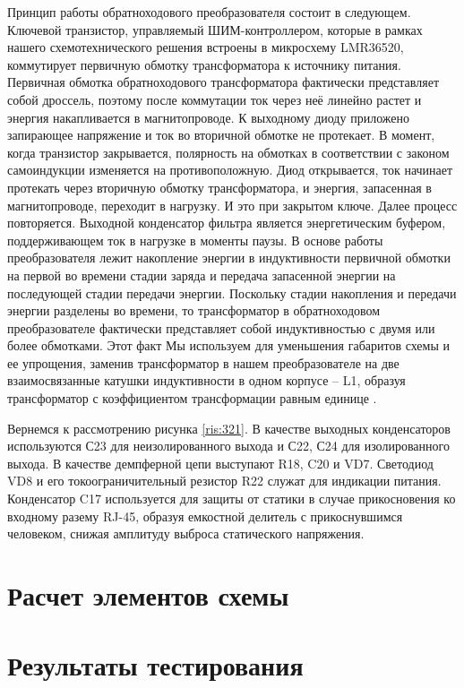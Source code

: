 Принцип работы обратноходового преобразователя состоит в следующем. Ключевой транзистор, 
управляемый ШИМ-контроллером, которые в рамках нашего схемотехнического решения встроены
в микросхему LMR36520, коммутирует первичную обмотку трансформатора к источнику питания.
Первичная обмотка обратноходового трансформатора фактически представляет собой дроссель, 
поэтому после коммутации ток через неё линейно растет и энергия накапливается в магнитопроводе. 
К выходному диоду приложено запирающее напряжение и ток во вторичной обмотке не протекает. 
В момент, когда транзистор закрывается, полярность на обмотках в соответствии с законом 
самоиндукции изменяется на противоположную. Диод открывается, ток начинает протекать через
вторичную обмотку трансформатора, и энергия, запасенная в магнитопроводе, переходит в нагрузку. 
И это при закрытом ключе. Далее процесс повторяется. Выходной конденсатор фильтра является 
энергетическим буфером, поддерживающем ток в нагрузке в моменты паузы.
В основе работы преобразователя лежит накопление энергии в индуктивности первичной обмотки 
на первой во времени стадии заряда и передача запасенной энергии на последующей стадии 
передачи энергии. Поскольку стадии накопления и передачи энергии разделены во времени, 
то трансформатор в обратноходовом преобразователе фактически представляет собой индуктивностью 
с двумя или более обмотками. Этот факт Мы используем для уменьшения габаритов схемы и ее упрощения,
заменив трансформатор в нашем преобразователе на две взаимосвязанные катушки индуктивности в 
одном корпусе -- L1, образуя трансформатор с коэффициентом трансформации равным единице
\cite{PowerElectronic:FlyBack} 
\cite{Würth Elektronik:Application Note}
\cite{DC-DC_Book:Recom}.

Вернемся к рассмотрению рисунка \ref{ris:321}. В качестве выходных конденсаторов используются
С23 для неизолированного выхода и С22, С24 для изолированного выхода. В качестве демпферной цепи 
выступают R18, C20 и VD7. Светодиод VD8 и его токоограничительный резистор R22 служат для 
индикации питания. Конденсатор C17 используется для защиты от статики в случае прикосновения ко 
входному разему RJ-45, образуя емкостной делитель с прикоснувшимся человеком, снижая амплитуду 
выброса статического напряжения. 



\section{Расчет элементов схемы}
\hspace{1cm} 

\section{Результаты тестирования}
\hspace{1cm} 
